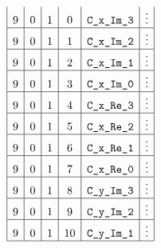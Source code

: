 \begin{figure}[h!]
\begin{adjustwidth}{-2cm}{-2cm}
\[\begin{array}{|c|c|c|c|c|c|c|}
                9 & 0      & 1      & 0           & \texttt{C\_x\_Im\_3}             & \vdots                                                                                                                        \\ \hline
                9 & 0      & 1      & 1           & \texttt{C\_x\_Im\_2}               & \vdots                                                                                                                        \\ \hline
                9 & 0      & 1      & 2           & \texttt{C\_x\_Im\_1}               & \vdots                                                                                                                        \\ \hline
                9 & 0      & 1      & 3           & \texttt{C\_x\_Im\_0}              & \vdots                                                                                                                        \\ \hline
                9 & 0      & 1      & 4           & \texttt{C\_x\_Re\_3}             & \vdots                                                                                                                        \\ \hline
                9 & 0      & 1      & 5           & \texttt{C\_x\_Re\_2}               & \vdots                                                                                                                        \\ \hline
                9 & 0      & 1      & 6           & \texttt{C\_x\_Re\_1}               & \vdots                                                                                                                        \\ \hline
                9 & 0      & 1      & 7           & \texttt{C\_x\_Re\_0}              & \vdots                                                                                                                        \\ \hline
                9 & 0      & 1      & 8           & \texttt{C\_y\_Im\_3}             & \vdots                                                                                                                        \\ \hline
                9 & 0      & 1      & 9           & \texttt{C\_y\_Im\_2}               & \vdots                                                                                                                        \\ \hline
                9 & 0      & 1      & 10          & \texttt{C\_y\_Im\_1}               & \vdots                                                                                                                        \\ \hline

\end{array}\]
\end{adjustwidth}
\end{figure}
